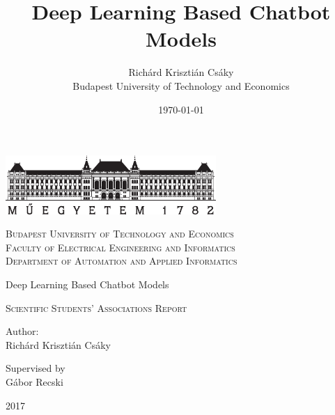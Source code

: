 \documentclass[12pt]{article}
\begin{document}
	\title{Deep Learning Based Chatbot Models}
	\author{Richárd Krisztián Csáky \\ Budapest University of Technology and Economics}
	\date{\today}
	
\begin{titlepage}
		\centering
		\includegraphics[width=0.6\textwidth]{pics/bme_logo_nagy.eps}\par\vspace{1cm}
		{\scshape Budapest University of Technology and Economics \\ Faculty of Electrical Engineering and Informatics \\
			Department of Automation and Applied Informatics \par}
		\vspace{2cm}
		{\huge\mdseries Deep Learning Based Chatbot Models\par}
		\vspace{0.5cm}
		{\scshape\Large Scientific Students' Associations Report\par}
		\vspace{1.5cm}
		
		{\Large Author: \\ Richárd Krisztián Csáky\par}
		\vspace{1.5cm}
		{\Large Supervised by \\ Gábor Recski\par}
		\vfill
		\par
		{\Large 2017\par}
		
		
\end{titlepage}
\end{document}
